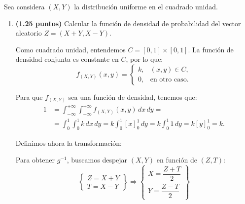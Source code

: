 \documentclass[12pt]{article}
\begin{document}
    \begin{ejercicio}
        Sea considera $(X,Y)$ la distribución uniforme en el cuadrado unidad.
        \begin{enumerate}
            \item \textbf{(1.25 puntos)} Calcular la función de densidad de probabilidad del vector aleatorio $Z = (X+Y,X-Y)$.
            
            Como cuadrado unidad, entendemos $C=[0,1]\times[0,1]$. La función de densidad conjunta es constante en $C$, por lo que:
            \begin{equation*}
                f_{(X,Y)}(x, y) = \begin{cases}
                    k, & (x,y)\in C, \\
                    0, & \text{en otro caso}.
                \end{cases}
            \end{equation*}

            Para que $f_{(X,Y)}$ sea una función de densidad, tenemos que:
            \begin{align*}
                1&=\int_{-\infty}^{+\infty} \int_{-\infty}^{+\infty} f_{(X,Y)}(x, y) \, dx \, dy
                =\\&= \int_{0}^{1} \int_{0}^{1} k \, dx \, dy
                = k\int_{0}^{1} \left[x\right]_{0}^{1} \, dy
                = k\int_{0}^{1} 1 \, dy
                = k\left[y\right]_{0}^{1}
                = k.
            \end{align*}

            Definimos ahora la transformación:

            Para obtener $g^{-1}$, buscamos despejar $(X,Y)$ en función de $(Z,T)$:
            \begin{equation*}
                \left\{
                    \begin{array}{l}
                        Z=X+Y\\
                        T=X-Y
                    \end{array}
                \right\}
                \Longrightarrow
                \left\{
                    \begin{array}{l}
                        X=\dfrac{Z+T}{2}\\
                        Y=\dfrac{Z-T}{2}
                    \end{array}
                \right\}
            \end{equation*}


\end{enumerate}
\end{ejercicio}
\end{document}
